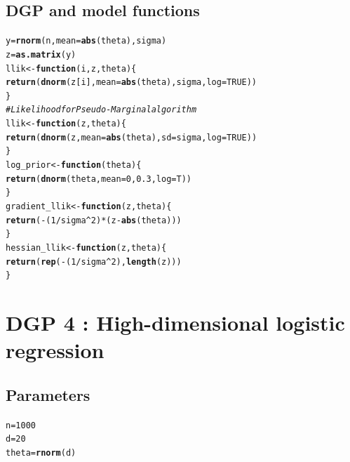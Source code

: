 \documentclass[11pt,a4paper]{report}\usepackage[]{graphicx}\usepackage[]{color}
\makeatletter
\newcommand{\hlnum}[1]{\textcolor[rgb]{0.686,0.059,0.569}{#1}}%
\newcommand{\hlcom}[1]{\textcolor[rgb]{0.678,0.584,0.686}{\textit{#1}}}%
\newcommand{\hlopt}[1]{\textcolor[rgb]{0,0,0}{#1}}%
\newcommand{\hlstd}[1]{\textcolor[rgb]{0.345,0.345,0.345}{#1}}%
\newcommand{\hlkwa}[1]{\textcolor[rgb]{0.161,0.373,0.58}{\textbf{#1}}}%
\newcommand{\hlkwb}[1]{\textcolor[rgb]{0.69,0.353,0.396}{#1}}%
\newcommand{\hlkwc}[1]{\textcolor[rgb]{0.333,0.667,0.333}{#1}}%
\newcommand{\hlkwd}[1]{\textcolor[rgb]{0.737,0.353,0.396}{\textbf{#1}}}%
\newenvironment{kframe}{%
 \def\at@end@of@kframe{}%
 \ifinner\ifhmode%
  \def\at@end@of@kframe{\end{minipage}}%
  \begin{minipage}{\columnwidth}%
 \fi\fi%
 \def\FrameCommand##1{\hskip\@totalleftmargin \hskip-\fboxsep
 \colorbox{shadecolor}{##1}\hskip-\fboxsep
     \hskip-\linewidth \hskip-\@totalleftmargin \hskip\columnwidth}%
 \MakeFramed {\advance\hsize-\width
   \@totalleftmargin\z@ \linewidth\hsize
   \@setminipage}}%
 {\par\unskip\endMakeFramed%
 \at@end@of@kframe}
\newenvironment{knitrout}{}{} %
\makeatother
\begin{document}
\begin{appendix}
\subsection{DGP and model functions}
\begin{knitrout}
\color{fgcolor}\begin{kframe}
\begin{alltt}
\hlstd{y}\hlkwb{=}\hlkwd{rnorm}\hlstd{(n,}\hlkwc{mean}\hlstd{=}\hlkwd{abs}\hlstd{(theta),sigma)}
\hlstd{z}\hlkwb{=}\hlkwd{as.matrix}\hlstd{(y)}
\hlstd{llik}\hlkwb{<-}\hlkwa{function} \hlstd{(}\hlkwc{i}\hlstd{,}\hlkwc{z}\hlstd{,}\hlkwc{theta}\hlstd{) \{}
  \hlkwd{return}\hlstd{(}\hlkwd{dnorm}\hlstd{(z[i],}\hlkwc{mean}\hlstd{=}\hlkwd{abs}\hlstd{(theta),sigma,} \hlkwc{log}\hlstd{=}\hlnum{TRUE}\hlstd{))}
\hlstd{\}}
\hlcom{#Likelihood for Pseudo-Marginal algorithm}
\hlstd{llik}\hlkwb{<-}\hlkwa{function} \hlstd{(}\hlkwc{z}\hlstd{,}\hlkwc{theta}\hlstd{) \{}
  \hlkwd{return}\hlstd{(}\hlkwd{dnorm}\hlstd{(z,}\hlkwc{mean}\hlstd{=}\hlkwd{abs}\hlstd{(theta),} \hlkwc{sd}\hlstd{=sigma,} \hlkwc{log}\hlstd{=}\hlnum{TRUE}\hlstd{))}
\hlstd{\}}
\hlstd{log_prior}\hlkwb{<-}\hlkwa{function}\hlstd{(}\hlkwc{theta}\hlstd{) \{}
  \hlkwd{return}\hlstd{(}\hlkwd{dnorm}\hlstd{(theta,}\hlkwc{mean}\hlstd{=}\hlnum{0}\hlstd{,}\hlnum{0.3}\hlstd{,}\hlkwc{log}\hlstd{=T))}
\hlstd{\}}
\hlstd{gradient_llik}\hlkwb{<-}\hlkwa{function}\hlstd{(}\hlkwc{z}\hlstd{,}\hlkwc{theta}\hlstd{) \{}
  \hlkwd{return}\hlstd{(}\hlopt{-}\hlstd{(}\hlnum{1}\hlopt{/}\hlstd{sigma}\hlopt{^}\hlnum{2}\hlstd{)}\hlopt{*}\hlstd{(z}\hlopt{-}\hlkwd{abs}\hlstd{(theta)))}
\hlstd{\}}
\hlstd{hessian_llik}\hlkwb{<-}\hlkwa{function}\hlstd{(}\hlkwc{z}\hlstd{,}\hlkwc{theta}\hlstd{) \{}
  \hlkwd{return}\hlstd{(}\hlkwd{rep}\hlstd{(}\hlopt{-}\hlstd{(}\hlnum{1}\hlopt{/}\hlstd{sigma}\hlopt{^}\hlnum{2}\hlstd{),}\hlkwd{length}\hlstd{(z)))}
\hlstd{\}}
\end{alltt}
\end{kframe}
\end{knitrout}

\section{DGP 4 : High-dimensional logistic regression}
\subsection{Parameters}
\begin{knitrout}
\color{fgcolor}\begin{kframe}
\begin{alltt}
\hlstd{n}\hlkwb{=}\hlnum{1000}
\hlstd{d}\hlkwb{=}\hlnum{20}
\hlstd{theta}\hlkwb{=}\hlkwd{rnorm}\hlstd{(d)}
\end{alltt}
\end{kframe}
\end{knitrout}

\end{appendix}
\end{document}
